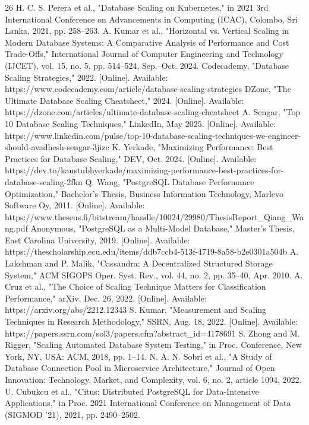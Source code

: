 \documentclass[conference]{IEEEtran}
\begin{document}
\begin{thebibliography}{26}
 H. C. S. Perera et al., "Database Scaling on Kubernetes," in 2021 3rd International Conference on Advancements in Computing (ICAC), Colombo, Sri Lanka, 2021, pp. 258--263.
 A. Kumar et al., "Horizontal vs. Vertical Scaling in Modern Database Systems: A Comparative Analysis of Performance and Cost Trade-Offs," International Journal of Computer Engineering and Technology (IJCET), vol. 15, no. 5, pp. 514--524, Sep.--Oct. 2024.
 Codecademy, "Database Scaling Strategies," 2022. [Online]. Available: https://www.codecademy.com/article/database-scaling-strategies
 DZone, "The Ultimate Database Scaling Cheatsheet," 2024. [Online]. Available: https://dzone.com/articles/ultimate-database-scaling-cheatsheet
 A. Sengar, "Top 10 Database Scaling Techniques," LinkedIn, May 2025. [Online]. Available: https://www.linkedin.com/pulse/top-10-database-scaling-techniques-we-engineer-should-avadhesh-sengar-3jizc
 K. Yerkade, "Maximizing Performance: Best Practices for Database Scaling," DEV, Oct. 2024. [Online]. Available: https://dev.to/kaustubhyerkade/maximizing-performance-best-practices-for-database-scaling-2fkn
 Q. Wang, "PostgreSQL Database Performance Optimization," Bachelor's Thesis, Business Information Technology, Marlevo Software Oy, 2011. [Online]. Available: https://www.theseus.fi/bitstream/handle/10024/29980/ThesisReport\_Qiang\_Wang.pdf
 Anonymous, "PostgreSQL as a Multi-Model Database," Master's Thesis, East Carolina University, 2019. [Online]. Available: https://thescholarship.ecu.edu/items/ddb7ccb4-513f-4719-8a58-b2e0301a504b
 A. Lakshman and P. Malik, "Cassandra: A Decentralized Structured Storage System," ACM SIGOPS Oper. Syst. Rev., vol. 44, no. 2, pp. 35--40, Apr. 2010.
 A. Cruz et al., "The Choice of Scaling Technique Matters for Classification Performance," arXiv, Dec. 26, 2022. [Online]. Available: https://arxiv.org/abs/2212.12343
 S. Kumar, "Measurement and Scaling Techniques in Research Methodology," SSRN, Aug. 18, 2022. [Online]. Available: https://papers.ssrn.com/sol3/papers.cfm?abstract\_id=4178691
 S. Zhong and M. Rigger, "Scaling Automated Database System Testing," in Proc. Conference, New York, NY, USA: ACM, 2018, pp. 1--14.
 N. A. N. Sobri et al., "A Study of Database Connection Pool in Microservice Architecture," Journal of Open Innovation: Technology, Market, and Complexity, vol. 6, no. 2, article 1094, 2022.
 U. Cubukcu et al., "Citus: Distributed PostgreSQL for Data-Intensive Applications," in Proc. 2021 International Conference on Management of Data (SIGMOD '21), 2021, pp. 2490--2502.

\end{thebibliography}
\end{document}
